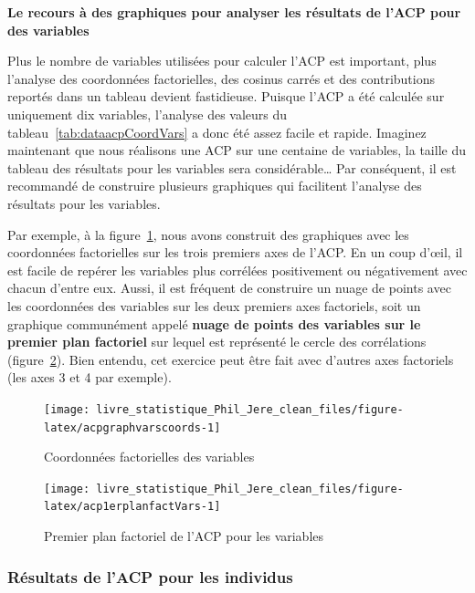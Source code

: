 \documentclass[
  11pt,
  french,
]{book}
\begin{document}
\textbf{Le recours à des graphiques pour analyser les résultats de l'ACP pour des variables}

Plus le nombre de variables utilisées pour calculer l'ACP est important, plus l'analyse des coordonnées factorielles, des cosinus carrés et des contributions reportés dans un tableau devient fastidieuse. Puisque l'ACP a été calculée sur uniquement dix variables, l'analyse des valeurs du tableau~\ref{tab:dataacpCoordVars} a donc été assez facile et rapide. Imaginez maintenant que nous réalisons une ACP sur une centaine de variables, la taille du tableau des résultats pour les variables sera considérable\ldots{} Par conséquent, il est recommandé de construire plusieurs graphiques qui facilitent l'analyse des résultats pour les variables.

Par exemple, à la figure~\ref{fig:acpgraphvarscoords}, nous avons construit des graphiques avec les coordonnées factorielles sur les trois premiers axes de l'ACP. En un coup d'œil, il est facile de repérer les variables plus corrélées positivement ou négativement avec chacun d'entre eux.
Aussi, il est fréquent de construire un nuage de points avec les coordonnées des variables sur les deux premiers axes factoriels, soit un graphique communément appelé \textbf{nuage de points des variables sur le premier plan factoriel} sur lequel est représenté le cercle des corrélations (figure~\ref{fig:acp1erplanfactVars}). Bien entendu, cet exercice peut être fait avec d'autres axes factoriels (les axes 3 et 4 par exemple).

\begin{figure}

{\centering \texttt{[image: livre\_statistique\_Phil\_Jere\_clean\_files/figure-latex/acpgraphvarscoords-1]} 

}

\caption{Coordonnées factorielles des variables}\label{fig:acpgraphvarscoords}
\end{figure}

\begin{figure}

{\centering \texttt{[image: livre\_statistique\_Phil\_Jere\_clean\_files/figure-latex/acp1erplanfactVars-1]} 

}

\caption{Premier plan factoriel de l'ACP pour les variables}\label{fig:acp1erplanfactVars}
\end{figure}

\hypertarget{sect12223}{%
\subsubsection{Résultats de l'ACP pour les individus}\label{sect12223}}
\end{document}

